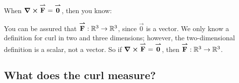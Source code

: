 \documentclass{ximera}
\begin{document}
\begin{question}
  When $\curl\vec{F} = \vec{0}$, then you know:
  \begin{selectAll}
  \end{selectAll}
  \begin{feedback}
    You can be assured that $\vec{F}:\R^3\to\R^3$, since $\vec{0}$ is
    a vector. We only know a definition for curl in two and three
    dimensions; however, the two-dimensional definition is a scalar,
    not a vector. So if $\curl\vec{F} = \vec{0}$, then
    $\vec{F}:\R^3\to\R^3$.
  \end{feedback}
\end{question}


\subsection{What does the curl measure?}
\end{document}
